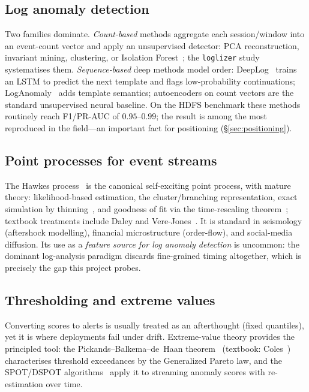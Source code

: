 \documentclass[11pt,a4paper]{report}
\newcommand{\code}[1]{\texttt{\small #1}}
\begin{document}
\subsection{Log anomaly detection}
Two families dominate. \emph{Count-based} methods aggregate each
session/window into an event-count vector and apply an unsupervised
detector: PCA reconstruction, invariant mining, clustering, or Isolation
Forest~\cite{iforest}; the \code{loglizer} study~\cite{loglizer}
systematises them. \emph{Sequence-based} deep methods model order:
DeepLog~\cite{deeplog} trains an LSTM to predict the next template and
flags low-probability continuations; LogAnomaly~\cite{loganomaly} adds
template semantics; autoencoders on count vectors are the standard
unsupervised neural baseline. On the HDFS benchmark these methods
routinely reach F1/PR-AUC of $0.95$--$0.99$; the result is among the most
reproduced in the field---an important fact for positioning
(\S\ref{sec:positioning}).

\subsection{Point processes for event streams}
The Hawkes process~\cite{hawkes} is the canonical self-exciting point
process, with mature theory: likelihood-based estimation, the
cluster/branching representation, exact simulation by thinning~\cite{ogata},
and goodness of fit via the time-rescaling theorem~\cite{timerescaling};
textbook treatments include Daley and Vere-Jones~\cite{daley}. It is
standard in seismology (aftershock modelling), financial microstructure
(order-flow), and social-media diffusion. Its use as a \emph{feature
source for log anomaly detection} is uncommon: the dominant log-analysis
paradigm discards fine-grained timing altogether, which is precisely the
gap this project probes.

\subsection{Thresholding and extreme values}
Converting scores to alerts is usually treated as an afterthought (fixed
quantiles), yet it is where deployments fail under drift. Extreme-value
theory provides the principled tool: the Pickands--Balkema--de~Haan
theorem~\cite{pickands} (textbook: Coles~\cite{coles}) characterises
threshold exceedances by the Generalized Pareto law, and the
SPOT/DSPOT algorithms~\cite{spot} apply it to streaming anomaly scores
with re-estimation over time.
\end{document}
